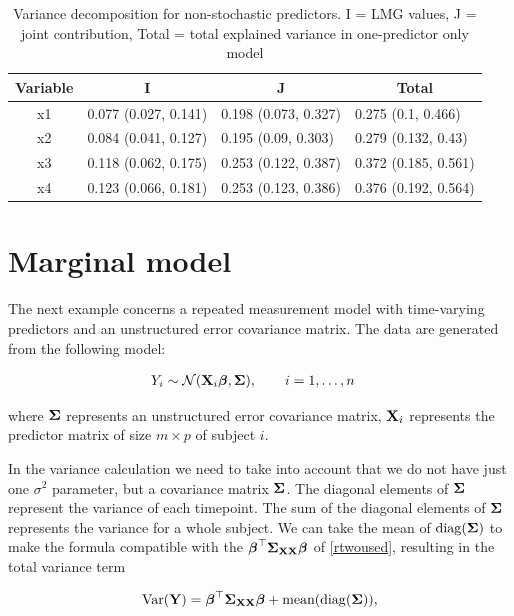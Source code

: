 \documentclass[11pt,a4paper,twoside]{book}\usepackage[]{graphicx}\usepackage[]{color}
\begin{document}
\begin{table}[h]
\caption{Variance decomposition for non-stochastic predictors. I = LMG values, J = joint contribution, Total = total explained variance in one-predictor only model}
\centering
\begin{tabular}{clll}
  \toprule
  \multicolumn{1}{c}{\textbf{Variable}} & \multicolumn{1}{c}{\textbf{I}} &\multicolumn{1}{c}{\textbf{J}} & \multicolumn{1}{c}{\textbf{Total}} \\
  \hline
x1 & 0.077 (0.027, 0.141)  & 0.198 (0.073, 0.327)   & 0.275 (0.1, 0.466)  \\ 
x2 & 0.084 (0.041, 0.127)  & 0.195 (0.09, 0.303)   & 0.279 (0.132, 0.43)  \\ 
x3 & 0.118 (0.062, 0.175)  & 0.253 (0.122, 0.387)   & 0.372 (0.185, 0.561)  \\ 
x4 & 0.123 (0.066, 0.181)  & 0.253 (0.123, 0.386)   & 0.376 (0.192, 0.564)  \\ 
   \bottomrule
\end{tabular}
\label{tbl:repeatedcormod.tot}
\end{table}



\section{Marginal  model}

The next example concerns a repeated measurement model with time-varying predictors and an unstructured error covariance matrix. The data are generated from the following model:

\begin{align} 
&Y_{i} \sim \mathcal{N}({\mathbf{X}}_{i} {\boldsymbol{\beta}}, {\boldsymbol{\Sigma}}{}), \qquad i = 1, \dots, n
\end{align} 

where ${\boldsymbol{\Sigma}}{}$ represents an unstructured error covariance matrix, ${\mathbf{X}}_{i}$ represents the predictor matrix of size $m \times p$ of subject $i$.

In the variance calculation we need to take into account that we do not have just one $\sigma^2$ parameter, but a covariance matrix ${\boldsymbol{\Sigma}}{}$. The diagonal elements of ${\boldsymbol{\Sigma}}{}$ represent the variance of each timepoint. The sum of the diagonal elements of ${\boldsymbol{\Sigma}}{}$ represents the variance for a whole subject. We can  take the mean of $\operatorname{diag}({\boldsymbol{\Sigma}}{})$ to make the formula compatible with the ${\boldsymbol{\beta}}^\top {\boldsymbol{\Sigma}}{}_{{\mathbf{X}} {\mathbf{X}}}  {\boldsymbol{\beta}}$ of \eqref{rtwoused}, resulting in the total variance term

      \begin{align} 
        \operatorname{Var}({\mathbf{Y}}) = {\boldsymbol{\beta}}^\top {\boldsymbol{\Sigma}}{}_{{\mathbf{X}} {\mathbf{X}}}  {\boldsymbol{\beta}} + \text{mean}(\operatorname{diag}({\boldsymbol{\Sigma}}{})),
   \end{align}
\end{document}
